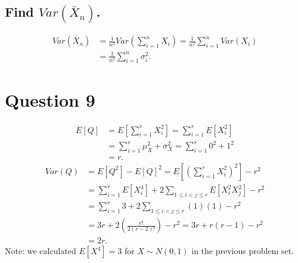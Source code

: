 \documentclass[11pt]{article} %
\begin{document}
\subsection{Find $Var(\bar{X}_n)$.}
\begin{align*}
Var(\bar{X}_n) &= \frac{1}{n^2}Var(\sum_{i=1}^n X_i) = \frac{1}{n^2}\sum_{i=1}^n Var(X_i) \\
&=  \frac{1}{n^2}\sum_{i=1}^n \sigma_i^2.
\end{align*}
\section{Question 9}
\begin{align*}
E[Q] &= E\left[ \sum_{i=1}^r X_i^2 \right] = \sum_{i=1}^r E\left[ X_i^2 \right]  \\
&=  \sum_{i=1}^r \mu_X^2 + \sigma_X^2 = \sum_{i=1}^r 0^2 + 1^2\\
&=  r.
\end{align*}
\begin{align*}
Var(Q) &= E[Q^2] - E[Q]^2 = E\left[\left(\sum_{i=1}^r X_i^2 \right)^2\right] - r^2\\
&= \sum_{i=1}^r E\left[X_i^4\right] + 2\sum_{1\leq i < j \leq r}E\left[ X_i^2X_j^2\right] -r^2 \\
&= \sum_{i=1}^r 3 + 2\sum_{1\leq i < j \leq r}(1)(1) -r^2 \\
&= 3r + 2\left( \frac{r!}{2(r-2)!}\right) -r^2 = 3r + r(r-1) -r^2 \\
&= 2r.
\end{align*}
Note: we calculated $E[X^4]=3$ for $X \sim N(0,1)$ in the previous problem set.
\end{document}
